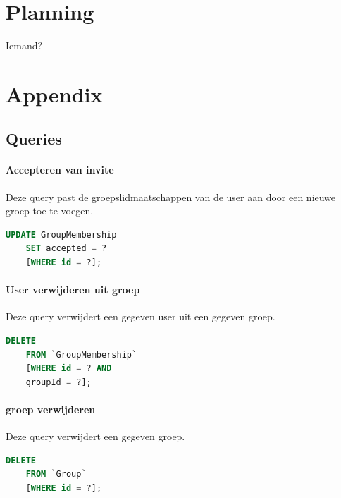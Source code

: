 \documentclass[11pt]{article}
\begin{document}
\section{Planning}


Iemand?



\section{Appendix}

\subsection{Queries}

\paragraph{Accepteren van invite}

  Deze query past de groepslidmaatschappen van de user aan door een nieuwe groep toe te voegen.

  \begin{framed}
  \begin{lstlisting}[language=sql]
    UPDATE GroupMembership
    SET accepted = ?
    [WHERE id = ?];
  \end{lstlisting}
  \end{framed}

\paragraph{User verwijderen uit groep}

  Deze query verwijdert een gegeven user uit een gegeven groep.

  \begin{framed}
  \begin{lstlisting}[language=sql]
    DELETE 
    FROM `GroupMembership` 
    [WHERE id = ? AND 
    groupId = ?];
  \end{lstlisting}
  \end{framed}
  
\paragraph{groep verwijderen}

  Deze query verwijdert een gegeven groep.

  \begin{framed}
  \begin{lstlisting}[language=sql]
    DELETE 
    FROM `Group` 
    [WHERE id = ?];
  \end{lstlisting}
  \end{framed}  
  
\end{document}
